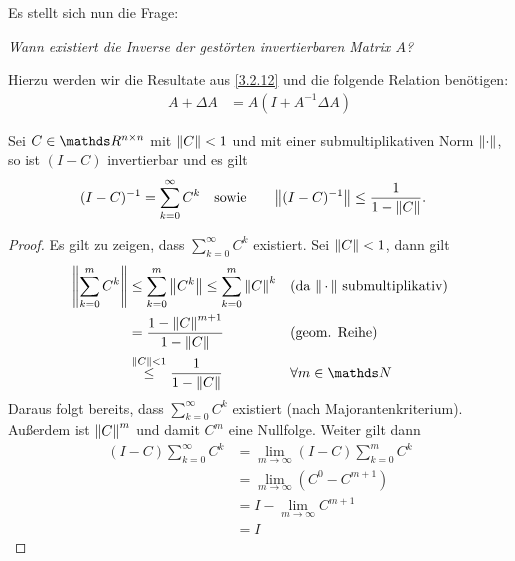   
  Es stellt sich nun die Frage:

  \textit{Wann existiert die Inverse der gestörten invertierbaren Matrix $A$?}

  Hierzu werden wir die Resultate aus \ref{3.2.12} 
  und die folgende Relation benötigen:
  \begin{align*}
    A+\Delta A &= A (I+A^{-1}\Delta A)
  \end{align*}


\begin{Leme}
  \label{3.2.12}
  \addtocounter{equation}{1}
  Sei $C\in\Renn$ mit $\left\| C \right\|<1$ und mit einer 
  submultiplikativen Norm $\left\| \cdot \right\|$,
  so ist $(I-C)$ invertierbar und es gilt
  \begin{align*}
    (I-C)^{-1}&=\sum_{k=0}^{\infty}C^k & \text{sowie} &\quad&
    \left\| (I-C)^ {-1} \right\| &\leq \frac{1}{1-\left\| C \right\|}.
  \end{align*}
\end{Leme}

\begin{proof}
  Es gilt zu zeigen, dass $\sum_{k=0}^{\infty}C^k$ existiert.
  Sei $\left\| C \right\| < 1$, dann gilt
  \begin{align*}
    \nn{ \sum_{k=0}^{m} C^k } 
    &\leq \sum_{k=0}^{m} \nn{C^k }  
    \leq \sum_{k=0}^{m}\nn{C}^k 
    && \text{(da $\nn{\,\cdot\,}$ submultiplikativ)}\\
    &= \frac{1-\nn{C}^{m+1}}{1-\nn{C}}
    &&\text{(geom. Reihe)}\\
    &\overset{\nn{C}<1}{\leq} \frac{1}{1-\nn{C}} 
    && \forall m\in \N
  \end{align*}
  Daraus folgt bereits, 
  dass $\sum_{k=0}^{\infty}C^k$ existiert (nach Majorantenkriterium).
  Außerdem ist $\left\| C \right\|^m$ und damit $C^m$ eine Nullfolge.
  Weiter gilt dann
  \begin{align*}
    (I-C) \sum_{k=0}^{\infty}C^k 
    &= \lim_{m\to \infty}(I-C) \sum_{k=0}^{m}C^k \\
    &= \lim_{m\to \infty} (C^0-C^{m+1}) \\
    &= I - \lim_{m\to \infty} C^{m+1} \\
    &=I 
  \end{align*}
\end{proof}

